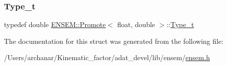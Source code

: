 \subsubsection{\texorpdfstring{Type\_t}{Type\_t}\hspace{0.1cm}{\footnotesize\ttfamily [2/2]}}
{\footnotesize\ttfamily typedef double \mbox{\hyperlink{structENSEM_1_1Promote}{E\+N\+S\+E\+M\+::\+Promote}}$<$ float, double $>$\+::\mbox{\hyperlink{structENSEM_1_1Promote_3_01float_00_01double_01_4_a09b7701594759488b49b335572cbfb62}{Type\+\_\+t}}}



The documentation for this struct was generated from the following file\+:\begin{DoxyCompactItemize}
\item 
/\+Users/archanar/\+Kinematic\+\_\+factor/adat\+\_\+devel/lib/ensem/\mbox{\hyperlink{lib_2ensem_2ensem_8h}{ensem.\+h}}\end{DoxyCompactItemize}
